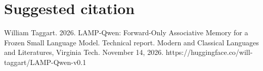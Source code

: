 \documentclass[manuscript,screen,nonacm]{acmart}
\begin{document}



\section*{Suggested citation}
William Taggart. 2026. LAMP-Qwen: Forward-Only Associative Memory for a Frozen Small Language Model. Technical report. Modern and Classical Languages and Literatures, Virginia Tech. November 14, 2026. https://huggingface.co/will-taggart/LAMP-Qwen-v0.1
\end{document}
